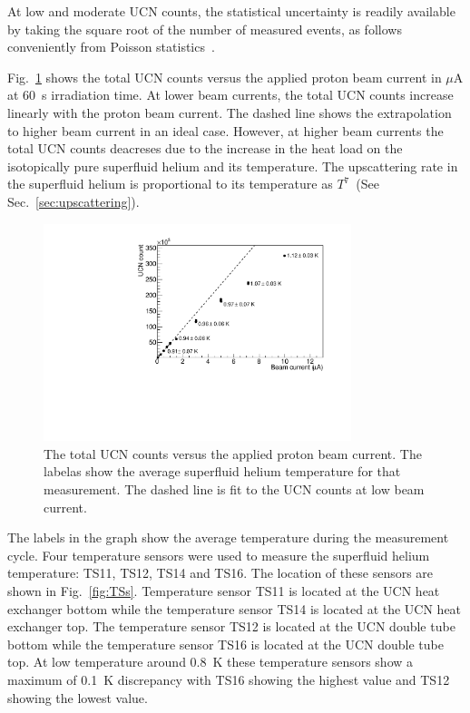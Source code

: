 At low and moderate UCN counts, the statistical uncertainty is readily
available by taking the square root of the number of measured events,
as follows conveniently from Poisson
statistics~\cite{pomme2015uncertainty}.


Fig.~\ref{fig:counts_vs_beam} shows the total UCN counts versus the
applied proton beam current in $\mu$A at 60~s irradiation time. At
lower beam currents, the total UCN counts increase linearly with the
proton beam current. The dashed line shows the extrapolation to higher
beam current in an ideal case. However, at higher beam currents the
total UCN counts deacreses due to the increase in the heat load on the
isotopically pure superfluid helium and its temperature. The
upscattering rate in the superfluid helium is proportional to its
temperature as $T^7$~(See Sec.~\ref{sec:upscattering}).



\begin{figure}[h!]
  \centering
  \includegraphics[width=0.8\textwidth]{UCNCounts_vs_Beam.pdf}
  \caption{The total UCN counts versus the applied proton beam
    current. The labelas show the average superfluid helium
    temperature for that measurement. The dashed line is fit to the
    UCN counts at low beam current. }
  \label{fig:counts_vs_beam}
\end{figure}



The labels in the graph show the average temperature during the
measurement cycle. Four temperature sensors were used to measure the
superfluid helium temperature: TS11, TS12, TS14 and TS16. The location
of these sensors are shown in Fig.~\ref{fig:TSs}. Temperature sensor
TS11 is located at the UCN heat exchanger bottom while the temperature
sensor TS14 is located at the UCN heat exchanger top. The temperature
sensor TS12 is located at the UCN double tube bottom while the
temperature sensor TS16 is located at the UCN double tube top. At low
temperature around 0.8~K these temperature sensors show a maximum of
0.1~K discrepancy with TS16 showing the highest value and TS12 showing
the lowest value.



